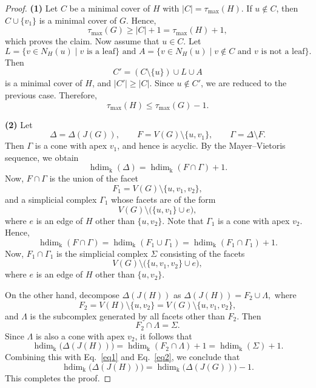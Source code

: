 \documentclass[10pt,a4paper]{amsart}
\DeclareMathOperator{\hdim}{hdim}
\def\k {\mathrm k}
\begin{document}
\begin{proof}
\textbf{(1)} Let $C$ be a minimal cover of $H$ with $|C| = \tau_{\max}(H)$. If $u \notin C$, then $C \cup \{v_1\}$ is a minimal cover of $G$. Hence,
\[
\tau_{\max}(G) \ge |C| + 1 = \tau_{\max}(H) + 1,
\]
which proves the claim. Now assume that $u \in C$. Let
\[
L = \{v \in N_H(u) \mid v \text{ is a leaf}\}
 \text{ and } 
A = \{v \in N_H(u) \mid v \notin C \text{ and } v \text{ is not a leaf}\}.
\]
Then
\[
C' = (C \setminus \{u\}) \cup L \cup A
\]
is a minimal cover of $H$, and \(|C'| \ge |C|.\) Since $u \notin C'$, we are reduced to the previous case. Therefore,
\[
\tau_{\max}(H) \le \tau_{\max}(G) - 1.
\]

\medskip

\textbf{(2)} Let
\[
\Delta = \Delta(J(G)),
\qquad
F = V(G) \setminus \{u,v_1\},
\qquad
\Gamma = \Delta \setminus F.
\]
Then $\Gamma$ is a cone with apex $v_1$, and hence is acyclic. By the Mayer--Vietoris sequence, we obtain
\begin{equation}\label{eq1}
\hdim_{\k}(\Delta)
=
\hdim_{\k}(F \cap \Gamma) + 1.
\end{equation}
Now, $F \cap \Gamma$ is the union of the facet
\[
F_1 = V(G) \setminus \{u,v_1,v_2\},
\]
and a simplicial complex $\Gamma_1$ whose facets are of the form
\[
V(G) \setminus \bigl(\{u,v_1\} \cup e\bigr),
\]
where $e$ is an edge of $H$ other than $\{u,v_2\}$. Note that $\Gamma_1$ is a cone with apex $v_2$. Hence,
\begin{equation}\label{eq2}
\hdim_\k (F \cap \Gamma) = \hdim_{\k}(F_1 \cup \Gamma_1)
=
\hdim_{\k}(F_1 \cap \Gamma_1) + 1.
\end{equation}
Now, $F_1 \cap \Gamma_1$ is the simplicial complex $\Sigma$ consisting of the facets
\[
V(G) \setminus \bigl(\{u,v_1,v_2\} \cup e\bigr),
\]
where $e$ is an edge of $H$ other than $\{u,v_2\}$.

On the other hand, decompose $\Delta(J(H))$ as \( \Delta(J(H)) = F_2 \cup \Lambda,\) where
\[
F_2 = V(H) \setminus \{u,v_2\}
     = V(G) \setminus \{u,v_1,v_2\},
\]
and $\Lambda$ is the subcomplex generated by all facets other than $F_2$. Then
\[
F_2 \cap \Lambda = \Sigma.
\]
Since $\Lambda$ is also a cone with apex $v_2$, it follows that
\[
\hdim_{\k}\bigl(\Delta(J(H))\bigr)
=
\hdim_{\k}(F_2 \cap \Lambda) + 1
=
\hdim_{\k}(\Sigma) + 1.
\]
Combining this with Eq.~\eqref{eq1} and Eq.~\eqref{eq2}, we conclude that
\[
\hdim_{\k}\bigl(\Delta(J(H))\bigr)
=
\hdim_{\k}\bigl(\Delta(J(G))\bigr) - 1.
\]
This completes the proof.
\end{proof}
\end{document}
